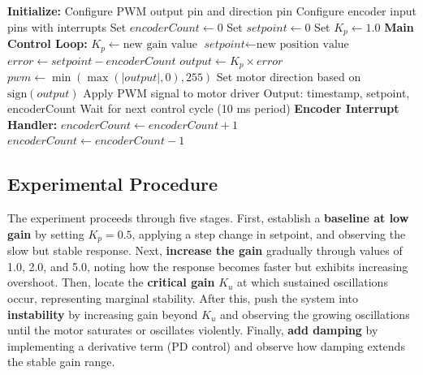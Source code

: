 \begin{algorithm}[H]
\caption{Motor Position Control with Adjustable Gain}
\label{alg:motor_control}
\begin{algorithmic}[1]
\State \textbf{Initialize:}
\State \hspace{1em} Configure PWM output pin and direction pin
\State \hspace{1em} Configure encoder input pins with interrupts
\State \hspace{1em} Set $\textit{encoderCount} \gets 0$
\State \hspace{1em} Set $\textit{setpoint} \gets 0$
\State \hspace{1em} Set $K_p \gets 1.0$ 
\State
\State \textbf{Main Control Loop:}
            \State $K_p \gets \text{new gain value}$
            \State $\textit{setpoint} \gets \text{new position value}$
        \EndIf
    \EndIf
    \State
    \State {}
    \State $\textit{error} \gets \textit{setpoint} - \textit{encoderCount}$
    \State $\textit{output} \gets K_p \times \textit{error}$
    \State
    \State {}
    \State $\textit{pwm} \gets \min(\max(|\textit{output}|, 0), 255)$
    \State Set motor direction based on $\text{sign}(\textit{output})$
    \State Apply PWM signal to motor driver
    \State
    \State {}
    \State Output: timestamp, setpoint, encoderCount
    \State Wait for next control cycle (10 ms period)
\EndWhile
\State
\State \textbf{Encoder Interrupt Handler:}
    \State $\textit{encoderCount} \gets \textit{encoderCount} + 1$
\Else
    \State $\textit{encoderCount} \gets \textit{encoderCount} - 1$
\EndIf
\end{algorithmic}
\end{algorithm}

\subsection{Experimental Procedure}

The experiment proceeds through five stages. First, establish a \textbf{baseline at low gain} by setting $K_p = 0.5$, applying a step change in setpoint, and observing the slow but stable response. Next, \textbf{increase the gain} gradually through values of 1.0, 2.0, and 5.0, noting how the response becomes faster but exhibits increasing overshoot. Then, locate the \textbf{critical gain} $K_u$ at which sustained oscillations occur, representing marginal stability. After this, push the system into \textbf{instability} by increasing gain beyond $K_u$ and observing the growing oscillations until the motor saturates or oscillates violently. Finally, \textbf{add damping} by implementing a derivative term (PD control) and observe how damping extends the stable gain range.

